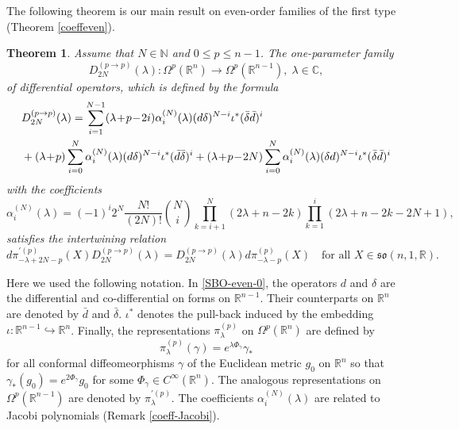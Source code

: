 \documentclass[a4paper,12pt,reqno]{amsart}
\newtheorem{thm}{Theorem}
\numberwithin{theorem}{subsection}
\numberwithin{equation}{section}
\begin{document}
The following theorem is our main result on even-order families of the first
type (Theorem \ref{coeffeven}).

\begin{thm}\label{main-even} Assume that $N \in {\mathbb{N}}$ and $0 \le p \le n-1$. The one-parameter family
\begin{equation*}
   D_{2N}^{(p \to p)}(\lambda): \Omega^p({\mathbb{R}}^n) \to \Omega^p({\mathbb{R}}^{n-1}), \; \lambda \in {\mathbb{C}},
\end{equation*}
of differential operators, which is defined by the formula
\begin{align}\label{SBO-even-0}
   & D_{2N}^{(p \to p)}(\lambda) = \sum_{i=1}^{N-1} (\lambda\!+\!p\!-\!2i) \alpha_i^{(N)}(\lambda) ({d} \delta)^{N-i}
   \iota^* (\bar{\delta} \bar{d})^i \notag \\
   & + (\lambda\!+\!p) \sum_{i=0}^N \alpha_i^{(N)}(\lambda) ({d}\delta)^{N-i} \iota^* (\bar{d} \bar{\delta})^i
   + (\lambda\!+\!p\!-\!2N) \sum_{i=0}^N \alpha_i^{(N)}(\lambda) (\delta {d})^{N-i}
   \iota^*(\bar{\delta} \bar{d})^i
\end{align}
with the coefficients
\begin{equation}\label{SBO-coeff-a}
   \alpha_i^{(N)}(\lambda) = (-1)^{i} 2^N \frac{N!}{(2N)!} \binom{N}{i}
   \prod_{k=i+1}^N (2\lambda\!+\!n\!-\!2k) \prod_{k=1}^i (2\lambda\!+\!n\!-\!2k\!-\!2N\!+\!1),
\end{equation}
satisfies the intertwining relation
\begin{equation}\label{inter-even}
   {d}\pi^{\prime (p)}_{-\lambda+2N-p}(X) D_{2N}^{(p \to p)}(\lambda) =
   D_{2N}^{(p \to p)}(\lambda) {d}\pi_{-\lambda-p}^{(p)}(X) \quad
   \mbox{for all $X \in \mathfrak{so}(n,1,{\mathbb{R}})$}.
\end{equation}
\end{thm}

Here we used the following notation. In \eqref{SBO-even-0}, the operators ${d}$
and $\delta$ are the differential and co-differential on forms on ${\mathbb{R}}^{n-1}$.
Their counterparts on ${\mathbb{R}}^n$ are denoted by $\bar{d}$ and $\bar{\delta}$.
$\iota^*$ denotes the pull-back induced by the embedding $\iota: {\mathbb{R}}^{n-1}
\hookrightarrow {\mathbb{R}}^n$. Finally, the representations $\pi_{\lambda}^{(p)}$ on
$\Omega^p({\mathbb{R}}^{n})$ are defined by
$$
   \pi_{\lambda}^{(p)}(\gamma) = e^{\lambda \Phi_\gamma} \gamma_*
$$
for all conformal diffeomeorphisms $\gamma$ of the Euclidean metric $g_0$ on
${\mathbb{R}}^n$ so that $\gamma_*(g_0) = e^{2\Phi_\gamma} g_0$ for some $\Phi_\gamma \in
C^\infty({\mathbb{R}}^{n})$. The analogous representations on $\Omega^p({\mathbb{R}}^{n-1})$ are
denoted by $\pi^{\prime (p)}_\lambda$. The coefficients
$\alpha_i^{(N)}(\lambda)$ are related to Jacobi polynomials (Remark
\ref{coeff-Jacobi}).
\end{document}
